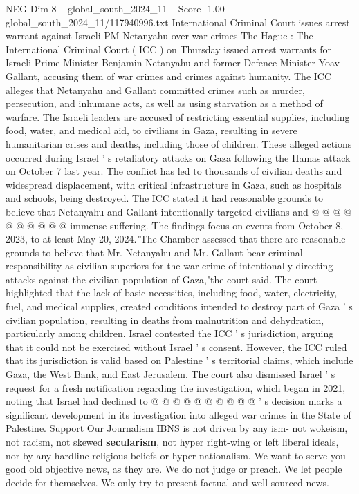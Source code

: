 \begin{textsample}{NEG Dim 8 – global\_south\_2024\_11 – Score -1.00 – global\_south\_2024\_11/117940996.txt}  \label{ex:f8_neg_313}
International Criminal Court issues arrest warrant against Israeli PM Netanyahu over war crimes The Hague : The International Criminal Court ( ICC ) on Thursday issued arrest warrants for Israeli Prime Minister Benjamin Netanyahu and former Defence Minister Yoav Gallant, accusing them of war crimes and crimes against humanity.
The ICC alleges that Netanyahu and Gallant committed crimes such as murder, persecution, and inhumane acts, as well as using starvation as a method of warfare.
The Israeli leaders are accused of restricting essential supplies, including food, water, and medical aid, to civilians in Gaza, resulting in severe humanitarian crises and deaths, including those of children.
These alleged actions occurred during Israel ' s retaliatory attacks on Gaza following the Hamas attack on October 7 last year.
The conflict has led to thousands of civilian deaths and widespread displacement, with critical infrastructure in Gaza, such as hospitals and schools, being destroyed.
The ICC stated it had reasonable grounds to believe that Netanyahu and Gallant intentionally targeted civilians and @ @ @ @ @ @ @ @ @ @ immense suffering.
The findings focus on events from October 8, 2023, to at least May 20, 2024."The Chamber assessed that there are reasonable grounds to believe that Mr.
Netanyahu and Mr.
Gallant bear criminal responsibility as civilian superiors for the war crime of intentionally directing attacks against the civilian population of Gaza,"the court said.
The court highlighted that the lack of basic necessities, including food, water, electricity, fuel, and medical supplies, created conditions intended to destroy part of Gaza ' s civilian population, resulting in deaths from malnutrition and dehydration, particularly among children.
Israel contested the ICC ' s jurisdiction, arguing that it could not be exercised without Israel ' s consent.
However, the ICC ruled that its jurisdiction is valid based on Palestine ' s territorial claims, which include Gaza, the West Bank, and East Jerusalem.
The court also dismissed Israel ' s request for a fresh notification regarding the investigation, which began in 2021, noting that Israel had declined to @ @ @ @ @ @ @ @ @ @ ' s decision marks a significant development in its investigation into alleged war crimes in the State of Palestine.
Support Our Journalism IBNS is not driven by any ism- not wokeism, not racism, not skewed \textbf{secularism}, not hyper right-wing or left liberal ideals, nor by any hardline religious beliefs or hyper nationalism.
We want to serve you good old objective news, as they are.
We do not judge or preach.
We let people decide for themselves.
We only try to present factual and well-sourced news.

\end{textsample}
